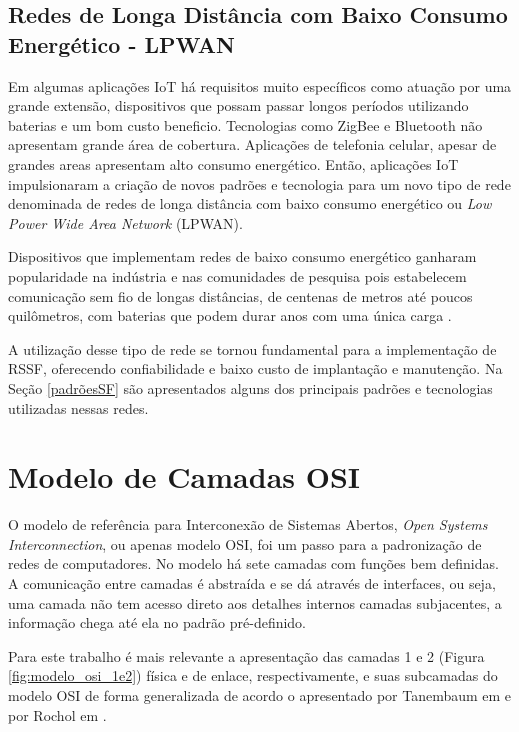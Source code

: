 \subsection{Redes de Longa Distância com Baixo Consumo Energético - LPWAN}
Em algumas aplicações IoT há requisitos muito específicos como atuação por uma grande extensão, dispositivos que possam passar longos períodos utilizando baterias e um bom custo beneficio. Tecnologias como ZigBee e Bluetooth não apresentam grande área de cobertura. Aplicações de telefonia celular, apesar de grandes areas apresentam alto consumo energético.  Então, aplicações IoT impulsionaram a criação de novos padrões e tecnologia para um novo tipo de rede denominada de redes de longa distância com baixo consumo energético ou \emph{Low Power Wide Area Network} (LPWAN).

Dispositivos que implementam redes de baixo consumo energético ganharam popularidade na indústria e nas comunidades de pesquisa pois estabelecem comunicação sem fio de longas distâncias, de centenas de metros até poucos quilômetros, com baterias que podem durar anos com uma única carga \cite{mekki2019comparative}.

A utilização desse tipo de rede se tornou fundamental para a implementação de RSSF, oferecendo confiabilidade e baixo custo de implantação e manutenção. Na Seção \ref{padrõesSF} são apresentados alguns dos principais padrões e tecnologias utilizadas nessas redes.

\section{Modelo de Camadas OSI}
\label{osi}
O modelo de referência para Interconexão de Sistemas Abertos, \emph{Open Systems Interconnection}, ou apenas modelo OSI, foi um passo para a padronização de redes de computadores. No modelo há sete camadas com funções bem definidas. A comunicação entre camadas é abstraída e se dá através de interfaces, ou seja, uma camada não tem acesso direto aos detalhes internos camadas subjacentes, a informação chega até ela no padrão pré-definido.

Para este trabalho é mais relevante a apresentação das camadas 1 e 2 (Figura \ref{fig:modelo_osi_1e2})  física e de enlace, respectivamente, e suas subcamadas do modelo OSI de forma generalizada de acordo o apresentado por Tanembaum em \cite{tanembaum2011} e por Rochol em \cite{rochol2018sistemas}.

